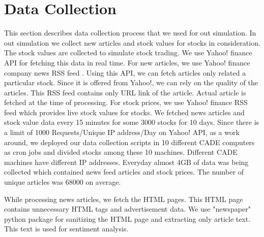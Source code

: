 \documentclass[a4paper,11pt]{article}
\begin{document}
\section{Data Collection}
This section describes data collection process that we used for out simulation. In out simulation we collect new articles and stock values for stocks in consideration. The stock values are collected to simulate stock trading. We use Yahoo! finance API for fetching this data in real time. For new articles, we use Yahoo! finance company news RSS feed \cite{news}. Using this API, we can fetch articles only related a particular stock. Since it is offered from Yahoo!, we can rely on the quality of the articles. This RSS feed contains only URL link of the article. Actual article is fetched at the time of processing. For stock prices, we use Yahoo! finance RSS feed which provides live stock values for stocks. We fetched news articles and stock value data every 15 minutes for some 3000 stocks for 10 days. Since there is a limit of 1000 Requests/Unique IP address/Day on Yahoo! API, as a work around, we deployed our data collection scripts in 10 different CADE computers as cron jobs and divided stocks among these 10 machines. Different CADE machines have different IP addresses. Everyday almost 4GB of data was being collected which contained news feed articles and stock prices. The number of unique articles was 68000 on average.
\par While processing news articles, we fetch the HTML pages. This HTML page contains unnecessary HTML tags and advertisement data. We use "newspaper" python package\cite{newspaper} for sanitizing the HTML page and extracting only article text. This text is used for sentiment analysis.
\end{document}
